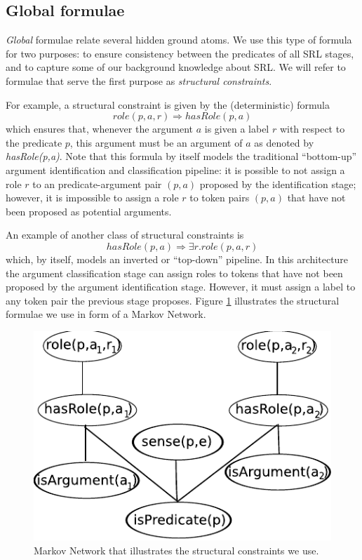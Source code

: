 \subsection{Global formulae}
\label{sec:global}

\emph{Global} formulae relate several hidden ground atoms. We use this type of formula for two purposes: to ensure consistency between the predicates of all SRL stages, and to capture some of our background knowledge about SRL. We will refer to formulae that serve the first purpose as \emph{structural constraints}. 

For example, a structural constraint is given by the (deterministic) formula
\[role(p,a,r) \Rightarrow hasRole(p,a)\]
which ensures that, whenever the argument $a$ is given a label $r$ with respect to the predicate $p$, this argument must be an argument of $a$ as denoted by \emph{hasRole(p,a)}. Note that this formula by itself models the traditional ``bottom-up'' argument identification and classification pipeline: it is possible to not assign a role $r$ to an predicate-argument pair $(p,a)$ proposed by the identification stage; however, it is impossible to assign a role $r$ to token pairs $(p,a)$ that have not been proposed as potential arguments.

An example of another class of structural constraints is 
\[
hasRole(p,a)\Rightarrow\exists r.role(p,a,r)
\]
which, by itself, models an inverted or ``top-down'' pipeline. In this architecture the argument classification stage can assign roles to tokens that have not been proposed by the argument identification stage. However, it must assign a label to any token pair the previous stage proposes. 
Figure \ref{fig:global2} illustrates the structural formulae we use in form of a Markov Network.

\begin{figure}[ht]
\begin{center}
   \includegraphics[scale=.70]{GlobalFormula2}
\end{center}
\caption{Markov Network that illustrates the structural constraints we use.}
\label{fig:global2}
\end{figure}

